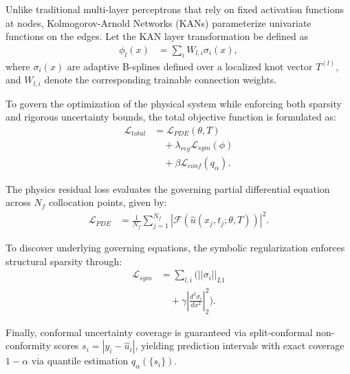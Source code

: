 \documentclass[10pt,twocolumn]{article}
\begin{document}
Unlike traditional multi-layer 
perceptrons that rely on 
fixed activation functions 
at nodes, Kolmogorov-Arnold 
Networks (KANs) parameterize 
univariate functions on the 
edges. Let the KAN layer 
transformation be defined as 
\begin{equation}
\begin{aligned}
\phi_{l}(x) &= \sum_{i} 
W_{l,i} \sigma_i(x),
\end{aligned}
\end{equation}
where $\sigma_i(x)$ are 
adaptive B-splines defined 
over a localized knot 
vector $T^{(l)}$, and 
$W_{l,i}$ denote the 
corresponding trainable 
connection weights. 

To govern the optimization 
of the physical system 
while enforcing both 
sparsity and rigorous 
uncertainty bounds, the 
total objective function 
is formulated as:
\begin{equation}
\begin{aligned}
\mathcal{L}_{total} &= 
\mathcal{L}_{PDE}(\theta, T) 
\\ &\quad 
+ \lambda_{reg} 
\mathcal{L}_{sym}(\phi) 
\\ &\quad 
+ \beta 
\mathcal{L}_{conf}(q_\alpha).
\end{aligned}
\end{equation}

The physics residual 
loss evaluates the governing 
partial differential 
equation across $N_f$ 
collocation points, 
given by:
\begin{equation}
\begin{aligned}
\mathcal{L}_{PDE} &= 
\frac{1}{N_f} 
\sum_{j=1}^{N_f} 
\left| \mathcal{F}\left(
\hat{u}(x_j, t_j; 
\theta, T)\right) \right|^2.
\end{aligned}
\end{equation}

To discover underlying 
governing equations, the 
symbolic regularization 
enforces structural 
sparsity through:
\begin{equation}
\begin{aligned}
\mathcal{L}_{sym} &= 
\sum_{l,i} \Big( 
||\sigma_i||_{L1} 
\\ &\quad 
+ \gamma \left| 
\frac{d^2 \sigma_i}{dx^2} 
\right|_2^2 \Big).
\end{aligned}
\end{equation}

Finally, conformal 
uncertainty coverage is 
guaranteed via 
split-conformal 
non-conformity scores 
$s_i = |y_i - \hat{u}_i|$, 
yielding prediction 
intervals with exact 
coverage $1-\alpha$ via 
quantile estimation 
$q_\alpha(\{s_i\})$.
\end{document}
